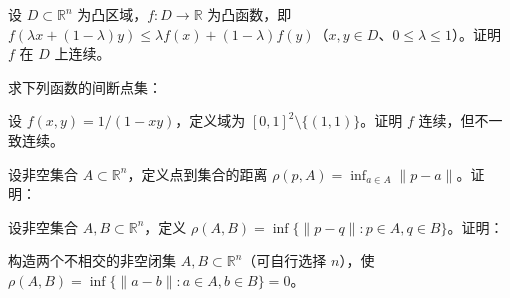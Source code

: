\noindent\begin{minipage}{\textwidth}
设 $D\subset\mathbb R^n$ 为凸区域，$f:D\to\mathbb R$ 为凸函数，即 $f(\lambda x+(1-\lambda)y)\le\lambda f(x)+(1-\lambda)f(y)$（$x,y\in D$、$0\le\lambda\le1$）。证明 $f$ 在 $D$ 上连续。
\end{minipage}\par\vfill
\noindent\begin{minipage}{\textwidth}
求下列函数的间断点集：
\end{minipage}\par\vfill
\newpage
\noindent\begin{minipage}{\textwidth}
设 $f(x,y)=1/(1-xy)$，定义域为 $[0,1]^2\setminus\{(1,1)\}$。证明 $f$ 连续，但不一致连续。
\end{minipage}\par\vfill
\noindent\begin{minipage}{\textwidth}
设非空集合 $A\subset\mathbb R^n$，定义点到集合的距离 $\rho(p,A)=\inf_{a\in A}\|p-a\|$。证明：
\end{minipage}\par\vfill
\noindent\begin{minipage}{\textwidth}
设非空集合 $A,B\subset\mathbb R^n$，定义 $\rho(A,B)=\inf\{\|p-q\|:p\in A,q\in B\}$。证明：
\end{minipage}\par\vfill
\newpage
\noindent\begin{minipage}{\textwidth}
构造两个不相交的非空闭集 $A,B\subset\mathbb R^n$（可自行选择 $n$），使 $\rho(A,B)=\inf\{\|a-b\|:a\in A,b\in B\}=0$。
\end{minipage}\par\vfill
